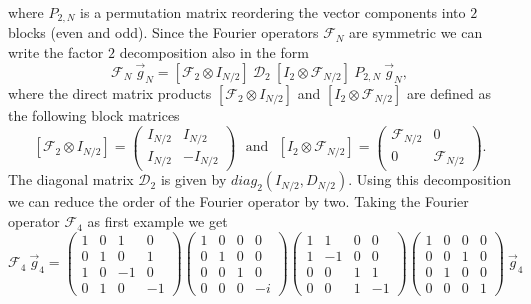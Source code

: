 where $P_{2,N}$ is a permutation matrix reordering the 
vector components into $2$ blocks (even and odd). Since
the Fourier operators $\mathcal{F}_{N}$ are symmetric we can
write the factor $2$ decomposition also in the form       
\begin{equation} \label{eq_FNFNr2_02} 
 \mathcal{F}_{N} \ \vec{g}_{N}
   = 
 \left[ \mathcal{F}_{2} \otimes I_{N/2} \right] \ 
 \mathcal{D}_{2} \ 
 \left[ I_{2} \otimes \mathcal{F}_{N/2} \right] \
 P_{2,N} \ \vec{g}_{N},
\end{equation}
where the direct matrix products 
$\left[ \mathcal{F}_{2} \otimes I_{N/2} \right]$ and  
$\left[ I_{2} \otimes \mathcal{F}_{N/2} \right]$ 
are defined as the following block 
matrices 
\begin{equation} \label{eq_dirmatprod}
 \left[ \mathcal{F}_{2} \otimes I_{N/2} \right]  
   = 
 \left(
  \begin{array}{cr}
    I_{N/2} & I_{N/2}
                      \\ 
    I_{N/2} & -I_{N/2}
  \end{array}
 \right)
 \ \ \ \mbox{and} \ \ \ 
\left[ I_{2} \otimes \mathcal{F}_{N/2} \right] = \left(\begin{array}{cc} \mathcal{F}_{N/2} &     0 \\ 
     0                & \mathcal{F}_{N/2}
  \end{array}
 \right).
\end{equation}
The diagonal matrix $\mathcal{D}_{2}$ is given by
$diag_{2}(I_{N/2},D_{N/2})$.
Using this decomposition we can reduce the order of the 
Fourier operator by two.  Taking the Fourier operator 
$\mathcal{F}_{4}$ as first example we get 
\begin{equation} \label{eq_exF4twoF2}
\mathcal{F}_{4} \ \vec{g}_{4}
 = 
 \left(
  \begin{array}{crrr}
   1 & 0 & 1 & 0
        \\
   0 & 1 & 0 & 1
        \\
   1 & 0 &-1 & 0
        \\
   0 & 1 & 0 &-1 
  \end{array}
 \right)
 \left(
  \begin{array}{crrr}
   1 & 0 & 0 & 0
        \\
   0 & 1 & 0 & 0
        \\
   0 & 0 & 1 & 0
        \\
   0 & 0 & 0 &-i 
  \end{array}
 \right)
 \left(
  \begin{array}{crrr}
   1 & 1 & 0 & 0
        \\
   1 &-1 & 0 & 0
        \\
   0 & 0 & 1 & 1
        \\
   0 & 0 & 1 &-1 
  \end{array}
 \right)
 \left(
  \begin{array}{crrr}
   1 & 0 & 0 & 0
        \\
   0 & 0 & 1 & 0
        \\
   0 & 1 & 0 & 0
        \\
   0 & 0 & 0 & 1
  \end{array}
 \right) 
  \ \vec{g}_{4} 
\end{equation}
